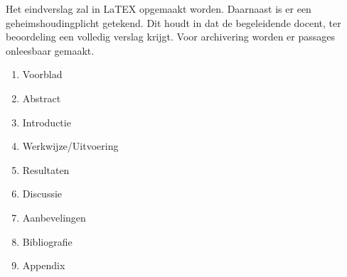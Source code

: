 
Het eindverslag zal in LaTEX opgemaakt worden. Daarnaast is er een geheimshoudingplicht getekend. Dit houdt in dat de begeleidende docent, ter beoordeling een volledig verslag krijgt. Voor archivering worden er passages onleesbaar gemaakt. 

\begin{enumerate}
	\item Voorblad
	\item Abstract
	\item Introductie
	\item Werkwijze/Uitvoering
	\item Resultaten
	\item Discussie
	\item Aanbevelingen
	\item Bibliografie
	\item Appendix
\end{enumerate}